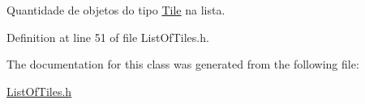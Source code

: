 Quantidade de objetos do tipo \hyperlink{classTile}{Tile} na lista. 



Definition at line 51 of file List\+Of\+Tiles.\+h.



The documentation for this class was generated from the following file\+:\begin{DoxyCompactItemize}
\item 
\hyperlink{ListOfTiles_8h}{List\+Of\+Tiles.\+h}\end{DoxyCompactItemize}
